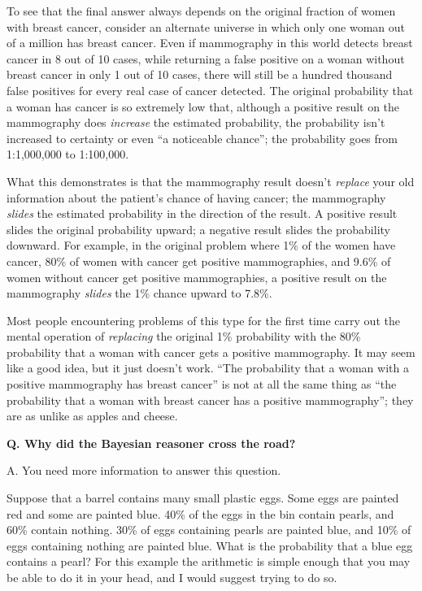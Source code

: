 {
 To see that the final answer always depends on the original
fraction of women with breast cancer, consider an alternate universe in
which only one woman out of a million has breast cancer. Even if
mammography in this world detects breast cancer in 8 out of 10 cases,
while returning a false positive on a woman without breast cancer in
only 1 out of 10 cases, there will still be a hundred thousand false
positives for every real case of cancer detected. The original
probability that a woman has cancer is so extremely low that, although
a positive result on the mammography does \textit{increase} the
estimated probability, the probability isn't increased
to certainty or even ``a noticeable
chance''; the probability goes from 1:1,000,000 to
1:100,000.}

{
 What this demonstrates is that the mammography result
doesn't \textit{replace} your old information about the
patient's chance of having cancer; the mammography
\textit{slides} the estimated probability in the direction of the
result. A positive result slides the original probability upward; a
negative result slides the probability downward. For example, in the
original problem where 1\% of the women have cancer, 80\% of women with
cancer get positive mammographies, and 9.6\% of women without cancer
get positive mammographies, a positive result on the mammography
\textit{slides} the 1\% chance upward to 7.8\%.}

{
 Most people encountering problems of this type for the first time
carry out the mental operation of \textit{replacing} the original 1\%
probability with the 80\% probability that a woman with cancer gets a
positive mammography. It may seem like a good idea, but it just
doesn't work. ``The probability that a
woman with a positive mammography has breast cancer''
is not at all the same thing as ``the probability that
a woman with breast cancer has a positive
mammography''; they are as unlike as apples and
cheese.}

{
 \textbf{Q. Why did the Bayesian reasoner cross the road?}}

{
 A. You need more information to answer this question.}

{
 Suppose that a barrel contains many small plastic eggs. Some eggs
are painted red and some are painted blue. 40\% of the eggs in the bin
contain pearls, and 60\% contain nothing. 30\% of eggs containing
pearls are painted blue, and 10\% of eggs containing nothing are
painted blue. What is the probability that a blue egg contains a pearl?
For this example the arithmetic is simple enough that you may be able
to do it in your head, and I would suggest trying to do so.}


